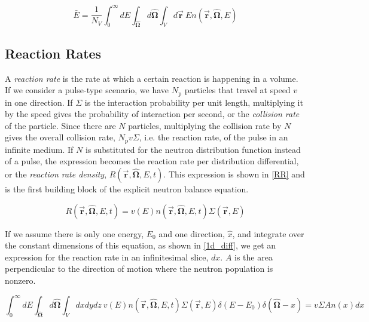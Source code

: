 \begin{equation}
\label{NDF_avg}
\bar{E} = \frac{1}{N_V } \int_0^\infty dE \int_{\boldsymbol{\hat{\Omega}}} d\boldsymbol{\hat{\Omega}}  \int_{V} d\boldsymbol{\vec{r}} \: E n(\boldsymbol{\vec{r}},\boldsymbol{\hat{\Omega}},E) 
\end{equation}

\subsection{Reaction Rates}

A \emph{reaction rate} is the rate at which a certain reaction is happening in a volume.  If we consider a pulse-type scenario, we have $N_\mathrm{p}$ particles that travel at speed $v$ in one direction.  If $\Sigma$ is the interaction probability per unit length, multiplying it by the speed gives the probability of interaction per second, or the \emph{collision rate} of the particle.  Since there are $N$ particles, multiplying the collision rate by $N$ gives the overall collision rate, $N_\mathrm{p} v \Sigma$, i.e. the reaction rate, of the pulse in an infinite medium.  If $N$ is substituted for the neutron distribution function instead of a pulse, the expression becomes the reaction rate per distribution differential, or the \emph{reaction rate density}, $R(\boldsymbol{\vec{r}},\boldsymbol{\hat{\Omega}},E,t)$.  This expression is shown in \eqref{RR} and is the first building block of the explicit neutron balance equation.

\begin{equation}
\label{RR}
R(\boldsymbol{\vec{r}},\boldsymbol{\hat{\Omega}},E,t)  = v(E) n(\boldsymbol{\vec{r}},\boldsymbol{\hat{\Omega}},E,t) \Sigma(\boldsymbol{\vec{r}},E)
\end{equation}

If we assume there is only one energy, $E_0$ and one direction, $\hat{x}$, and integrate over the constant dimensions of this equation, as shown in \eqref{1d_diff}, we get an expression for the reaction rate in an infinitesimal slice, $dx$.  $A$ is the area perpendicular to the direction of motion where the neutron population is nonzero.


\begin{equation}
\label{1d_diff}
 \int_0^\infty dE \int_{\boldsymbol{\hat{\Omega}}} d\boldsymbol{\hat{\Omega}}  \int_{V} dx dy dz \:  v(E) n(\boldsymbol{\vec{r}},\boldsymbol{\hat{\Omega}},E,t) \Sigma(\boldsymbol{\vec{r}},E) \delta(E-E_0) \delta(\boldsymbol{\hat{\Omega}}-\hat{x})  = v \Sigma A n(x)dx 
\end{equation}

